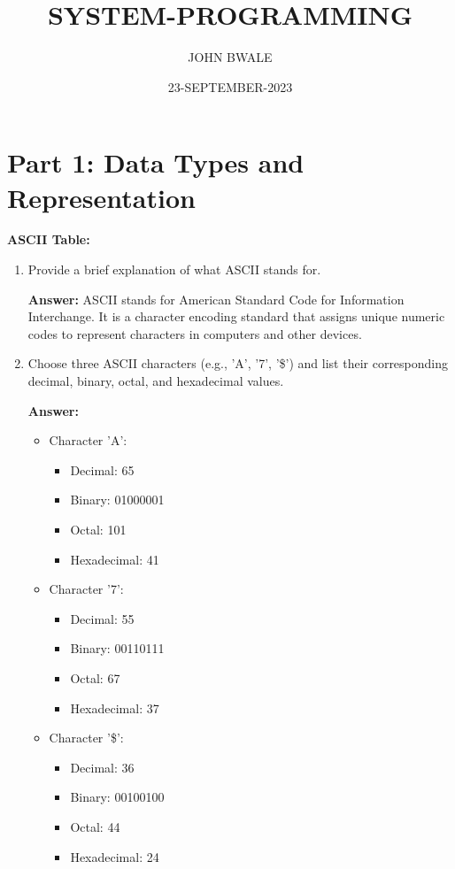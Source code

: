 \documentclass{article}
\begin{document}
\title{SYSTEM-PROGRAMMING}
\author{JOHN BWALE}
\date{23-SEPTEMBER-2023}

\maketitle

\section*{Part 1: Data Types and Representation}

\textbf{ASCII Table:}
\begin{enumerate}
    \item Provide a brief explanation of what ASCII stands for.
    
    \textbf{Answer:}
    ASCII stands for American Standard Code for Information Interchange. It is a character encoding standard that assigns unique numeric codes to represent characters in computers and other devices.

    \item Choose three ASCII characters (e.g., 'A', '7', '\$') and list their corresponding decimal, binary, octal, and hexadecimal values.
    
    \textbf{Answer:}
    \begin{itemize}
        \item Character 'A':
            \begin{itemize}
                \item Decimal: 65
                \item Binary: 01000001
                \item Octal: 101
                \item Hexadecimal: 41
            \end{itemize}
        \item Character '7':
            \begin{itemize}
                \item Decimal: 55
                \item Binary: 00110111
                \item Octal: 67
                \item Hexadecimal: 37
            \end{itemize}
        \item Character '\$':
            \begin{itemize}
                \item Decimal: 36
                \item Binary: 00100100
                \item Octal: 44
                \item Hexadecimal: 24
            \end{itemize}
    \end{itemize}

\end{enumerate}
\end{document}
